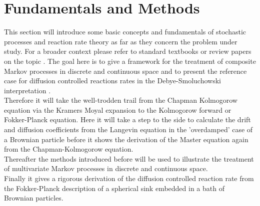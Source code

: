 
\chapter{Fundamentals and Methods}
\label{Short_Introduction_to_Stochastic_Processes}
This section will introduce some basic concepts and fundamentals of stochastic processes and reaction rate theory as far as they concern the problem under study. For a broader context please refer to standard textbooks \cite{VanKampen1992} or review papers on the topic \cite{Calef1983a, Bressloff2013}. The goal here is to give a framework for the treatment of composite Markov processes in discrete and continuous space and to present the reference case for diffusion controlled reactions rates in the Debye-Smoluchowski interpretation \cite{Smoluchowski1917a, Debye1942}. \\
Therefore it will take the well-trodden trail from the Chapman Kolmogorow equation via the Kramers Moyal expansion to the Kolmogorow forward or Fokker-Planck equation. Here it will take a step to the side to calculate the drift and diffusion coefficients from the Langevin equation in the 'overdamped' case of a Brownian particle before it shows the derivation of the Master equation again from the Chapman-Kolmogorow equation.\\
Thereafter the methods introduced before will be used to illustrate the treatment of multivariate Markov processes in discrete and continuous space. \\
Finally it gives a rigorous derivation of the diffusion controlled reaction rate from the Fokker-Planck description of a spherical sink embedded in a bath of Brownian particles.
